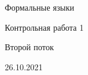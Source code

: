 \documentclass[12pt]{article}
\begin{document}






\begin{center}
{\LARGE Формальные языки}

{\Large Контрольная работа 1}

{\Large Второй поток}

{\large 26.10.2021}
\end{center}
\end{document}
